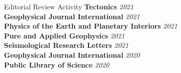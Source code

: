 \begin{rSection}{Editorial Review Activity}
	\textbf{Tectonics} \hfill \textit{2021} \\
	\textbf{Geophysical Journal International} \hfill \textit{2021} \\
	\textbf{Physics of the Earth and Planetary Interiors} \hfill \textit{2021} \\
	\textbf{Pure and Applied Geophysics} \hfill \textit{2021} \\
	\textbf{Seismological Research Letters} \hfill \textit{2021}\\
	\textbf{Geophysical Journal International} \hfill \textit{2020} \\
	\textbf{Public Library of Science} \hfill \textit{2020}
\end{rSection}